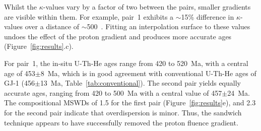 \documentclass{article}
\begin{document}
Whilst the $\kappa$-values vary by a factor of two between the pairs,
smaller gradients are visible within them. For example, pair~1
exhibits a $\sim$15\% difference in $\kappa$-values over a distance of
$\sim$500~. Fitting an interpolation surface to these values
undoes the effect of the proton gradient and produces more accurate
ages (Figure~\ref{fig:results}.c).\medskip

For pair~1, the in-situ U-Th-He ages range from 420 to 520~Ma, with a
central age of 453$\pm$8~Ma, which is in good agreement with
conventional U-Th-He ages of GJ-1 (456$\pm$13~Ma,
Table~\ref{tab:conventional}). The second pair yields equally accurate
ages, ranging from 420 to 500~Ma with a central value of
457$\pm$24~Ma. The compositional MSWDs \citep[as defined
  by][]{vermeesch2010a} of 1.5 for the first pair
(Figure~\ref{fig:results}e), and 2.3 for the second pair indicate that
overdispersion is minor.  Thus, the sandwich technique appears to have
successfully removed the proton fluence gradient.
\end{document}
